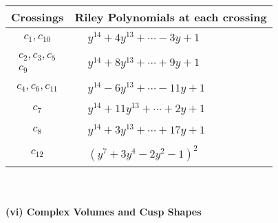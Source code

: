 \documentclass[1p]{elsarticle_modified}
\theoremstyle{definition}
\begin{document}
\begin{tabular}{m{50pt}|m{274pt}}
Crossings & \hspace{64pt}Riley Polynomials at each crossing \\
\hline $$\begin{aligned}c_{1},c_{10}\end{aligned}$$&$\begin{aligned}
&y^{14}+4 y^{13}+\cdots-3 y+1
\end{aligned}$\\
\hline $$\begin{aligned}c_{2},c_{3},c_{5}\\c_{9}\end{aligned}$$&$\begin{aligned}
&y^{14}+8 y^{13}+\cdots+9 y+1
\end{aligned}$\\
\hline $$\begin{aligned}c_{4},c_{6},c_{11}\end{aligned}$$&$\begin{aligned}
&y^{14}-6 y^{13}+\cdots-11 y+1
\end{aligned}$\\
\hline $$\begin{aligned}c_{7}\end{aligned}$$&$\begin{aligned}
&y^{14}+11 y^{13}+\cdots+2 y+1
\end{aligned}$\\
\hline $$\begin{aligned}c_{8}\end{aligned}$$&$\begin{aligned}
&y^{14}+3 y^{13}+\cdots+17 y+1
\end{aligned}$\\
\hline $$\begin{aligned}c_{12}\end{aligned}$$&$\begin{aligned}
&(y^7+3 y^4-2 y^2-1)^2
\end{aligned}$\\
\hline
\end{tabular}\\~\\
\newpage\flushleft \textbf{(vi) Complex Volumes and Cusp Shapes}
\end{document}
